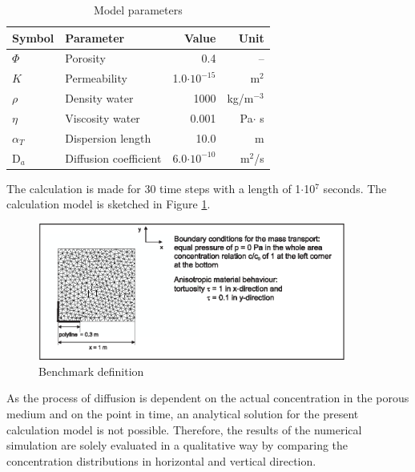 \begin{table}[h]%
\begin{center}
\begin{tabular}{llrr}
\toprule
Symbol & Parameter & Value & Unit \\
\midrule
$\Phi$ & Porosity & 0.4 & -- \\
$K$ & Permeability & 1.0$\cdot 10^{-15}$ & m$^2$ \\
$\rho$ & Density water & 1000 & kg/m$^{-3}$  \\		
$\eta$ & Viscosity water & 0.001 & Pa$\cdot$ s \\
$\alpha_T$ & Dispersion length & 10.0 & m \\
D$_a$ & Diffusion coefficient & 6.0$\cdot 10^{-10}$ & m$^2$/s  \\
\bottomrule
\end{tabular}
\caption{Model parameters}
\label{tab55}
\end{center}
\end{table}

The calculation is made for 30 time steps with a length of 1$\cdot$10$^7$ seconds. The calculation model is sketched in Figure \ref{fig511}.

\begin{figure}[htbp]
\centering
\includegraphics[width=0.9\textwidth]{PART_II/C/fig511.eps}
\caption{Benchmark definition}
\label{fig511}
\end{figure}


As the process of diffusion is dependent on the actual concentration in the porous medium and on the point in time, an analytical solution for the present calculation model is not possible. Therefore, the results of the numerical simulation are solely evaluated in a qualitative way by comparing the concentration distributions in horizontal and vertical direction.

